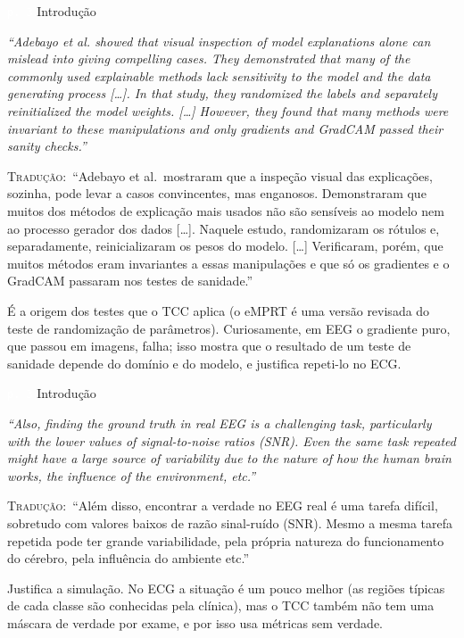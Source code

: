 \documentclass[11pt,a4paper]{article}
\newcommand{\pagechip}[1]{{\setlength{\fboxsep}{1.5pt}\colorbox{cAcc}{\textcolor{white}{\scriptsize\texttt{#1}}}}}
\newenvironment{origquote}{\par\itshape\small}{\par}
\newenvironment{tradquote}{\par\small\textsc{Tradução:}\ }{\par}
\newcommand{\explab}[1]{\par\smallskip{\small\color{cAcc}\textbf{\MakeUppercase{#1}}}\par}
\begin{document}
\begin{citacard}{\pagechip{p. 3} Introdução}
\begin{origquote}“Adebayo et al. showed that visual inspection of model explanations alone can mislead into giving compelling cases. They demonstrated that many of the commonly used explainable methods lack sensitivity to the model and the data generating process [\ldots]. In that study, they randomized the labels and separately reinitialized the model weights. [\ldots] However, they found that many methods were invariant to these manipulations and only gradients and GradCAM passed their sanity checks.”\end{origquote}
\begin{tradquote}“Adebayo et al.\ mostraram que a inspeção visual das explicações, sozinha, pode levar a casos convincentes, mas enganosos. Demonstraram que muitos dos métodos de explicação mais usados não são sensíveis ao modelo nem ao processo gerador dos dados [\ldots]. Naquele estudo, randomizaram os rótulos e, separadamente, reinicializaram os pesos do modelo. [\ldots] Verificaram, porém, que muitos métodos eram invariantes a essas manipulações e que só os gradientes e o GradCAM passaram nos testes de sanidade.”\end{tradquote}
\explab{Explicação}
É a origem dos testes que o TCC aplica (o eMPRT é uma versão revisada do teste de randomização de parâmetros). Curiosamente, em EEG o gradiente puro, que passou em imagens, falha; isso mostra que o resultado de um teste de sanidade depende do domínio e do modelo, e justifica repeti-lo no ECG.
\end{citacard}

\begin{citacard}{\pagechip{p. 3} Introdução}
\begin{origquote}“Also, finding the ground truth in real EEG is a challenging task, particularly with the lower values of signal-to-noise ratios (SNR). Even the same task repeated might have a large source of variability due to the nature of how the human brain works, the influence of the environment, etc.”\end{origquote}
\begin{tradquote}“Além disso, encontrar a verdade no EEG real é uma tarefa difícil, sobretudo com valores baixos de razão sinal-ruído (SNR). Mesmo a mesma tarefa repetida pode ter grande variabilidade, pela própria natureza do funcionamento do cérebro, pela influência do ambiente etc.”\end{tradquote}
\explab{Explicação}
Justifica a simulação. No ECG a situação é um pouco melhor (as regiões típicas de cada classe são conhecidas pela clínica), mas o TCC também não tem uma máscara de verdade por exame, e por isso usa métricas sem verdade.
\end{citacard}
\end{document}
